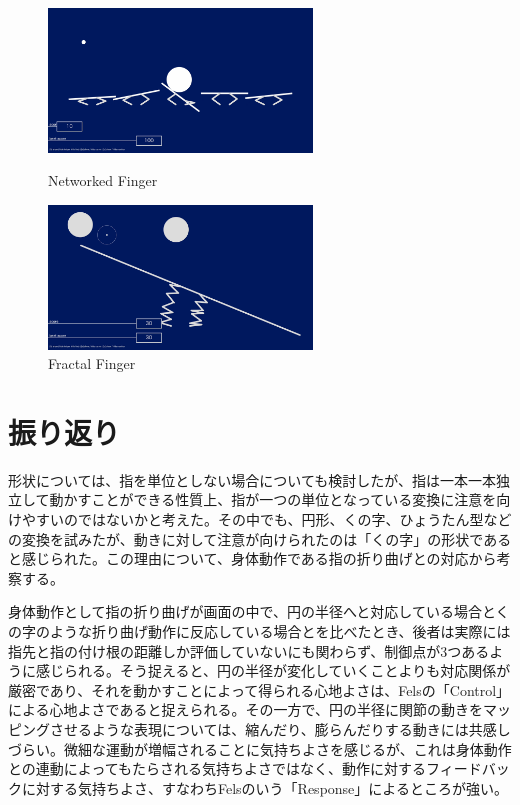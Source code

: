 \begin{figure}[htbp]
  \begin{minipage}[b]{0.5\linewidth}
    \centering
    \includegraphics[keepaspectratio, width=7cm]{img/ball_0.png}
    \caption{Networked Finger}
    \label{fig:ball_0}
  \end{minipage}
  \begin{minipage}[b]{0.5\linewidth}
    \centering
    \includegraphics[keepaspectratio, width=7cm]{img/ball_1.png}
    \caption{Fractal Finger}
    \label{fig:ball_1}
  \end{minipage}
\end{figure}

\section{振り返り}
形状については、指を単位としない場合についても検討したが、指は一本一本独立して動かすことができる性質上、指が一つの単位となっている変換に注意を向けやすいのではないかと考えた。その中でも、円形、くの字、ひょうたん型などの変換を試みたが、動きに対して注意が向けられたのは「くの字」の形状であると感じられた。この理由について、身体動作である指の折り曲げとの対応から考察する。

身体動作として指の折り曲げが画面の中で、円の半径へと対応している場合とくの字のような折り曲げ動作に反応している場合とを比べたとき、後者は実際には指先と指の付け根の距離しか評価していないにも関わらず、制御点が3つあるように感じられる。そう捉えると、円の半径が変化していくことよりも対応関係が厳密であり、それを動かすことによって得られる心地よさは、Felsの「Control」による心地よさであると捉えられる。その一方で、円の半径に関節の動きをマッピングさせるような表現については、縮んだり、膨らんだりする動きには共感しづらい。微細な運動が増幅されることに気持ちよさを感じるが、これは身体動作との連動によってもたらされる気持ちよさではなく、動作に対するフィードバックに対する気持ちよさ、すなわちFelsのいう「Response」によるところが強い。

